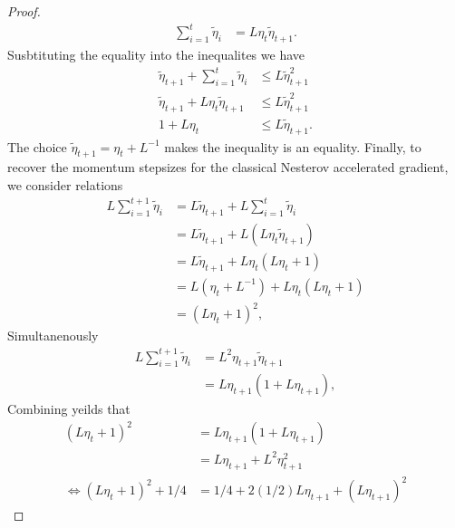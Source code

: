 \documentclass[12pt]{article}
\begin{document}
\begin{proof}
\begin{align*}
                \sum_{i = 1}^{t}\tilde \eta_i 
                &= 
                L \eta_t \tilde \eta_{t + 1}. 
            \end{align*}
            Susbtituting the equality into the inequalites we have 
            \begin{align*}
                \tilde \eta_{t + 1} + \sum_{i = 1}^{t} \tilde \eta_i 
                &\le L \tilde \eta_{t + 1}^2
                \\
                \tilde \eta_{t + 1} + L\eta_t \tilde \eta_{t + 1}
                &\le L \tilde \eta_{t + 1}^2
                \\
                1 + L\eta_t &\le L \tilde\eta_{t + 1}. 
            \end{align*}
            The choice $\tilde \eta_{t + 1} = \eta_t + L^{-1}$ makes the inequality is an equality. 
            Finally, to recover the momentum stepsizes for the classical Nesterov accelerated gradient, we consider relations 
            \begin{align*}
                L \sum_{i = 1}^{t + 1} \tilde \eta_i 
                &= L \tilde \eta_{t + 1} + L \sum_{i = 1}^{t} \tilde \eta_i 
                \\
                &= 
                L \tilde \eta_{t + 1} + L (L \eta_t \tilde \eta_{t + 1}) 
                \\
                &= L \tilde \eta_{t + 1} + L \eta_t (L \eta_t + 1)
                \\
                &= L (\eta_t + L^{-1}) + L\eta_t (L \eta_t + 1)
                \\
                &= (L\eta_t + 1)^2, 
            \end{align*}
            Simultanenously 
            \begin{align*}
                L \sum_{i = 1}^{t + 1} \tilde \eta_i 
                &= L^2 \eta_{t + 1} \tilde \eta_{t + 1}
                \\
                &= L \eta_{t + 1}(1+ L \eta_{t + 1}), 
            \end{align*}
            Combining yeilds that 
            \begin{align*}
                (L\eta_t + 1)^2 
                &= L\eta_{t + 1}(1 + L \eta_{t + 1})
                \\
                &= L\eta_{t + 1} + L^2 \eta_{t + 1}^2
                \\
                \iff 
                (L\eta_t + 1)^2 + 1/4 &= 
                1/4 + 2(1/2)L \eta_{t + 1} + (L \eta_{t + 1})^2

\end{align*}
\end{proof}
\end{document}
